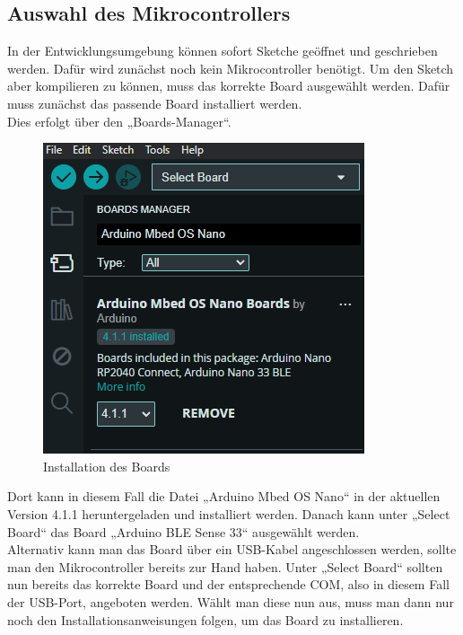 \subsection{Auswahl des Mikrocontrollers}
In der Entwicklungsumgebung können sofort Sketche geöffnet und geschrieben werden. Dafür wird zunächst noch kein Mikrocontroller benötigt. Um den Sketch aber kompilieren zu können, muss das korrekte Board ausgewählt werden.
Dafür muss zunächst das passende Board installiert werden. \\
 Dies erfolgt über den „Boards-Manager“.
\begin{figure}[htb]
	\begin{center}
		\includegraphics[width=\textwidth]{General/Boardsmanager}
		\caption{Installation des Boards} \label{Installation des Boards}
	\end{center}
\end{figure}
Dort kann in diesem Fall die Datei „Arduino Mbed OS Nano“ in der aktuellen Version 4.1.1 heruntergeladen und installiert werden. Danach kann unter „Select Board“ das Board „Arduino BLE Sense 33“ ausgewählt werden.\\
Alternativ kann man das Board über ein USB-Kabel angeschlossen werden, sollte man den Mikrocontroller bereits zur Hand haben. Unter „Select Board“ sollten nun bereits das korrekte Board und der entsprechende COM, also in diesem Fall der USB-Port, angeboten werden. Wählt man diese nun aus, muss man dann nur noch den Installationsanweisungen folgen, um das Board zu installieren.\\

